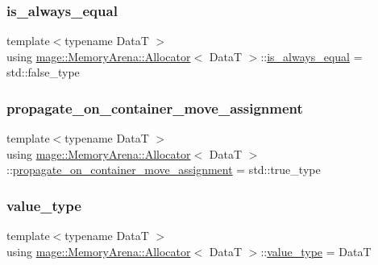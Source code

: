 \subsubsection{\texorpdfstring{is\+\_\+always\+\_\+equal}{is\_always\_equal}}
{\footnotesize\ttfamily template$<$typename DataT $>$ \\
using \hyperlink{classmage_1_1_memory_arena_1_1_allocator}{mage\+::\+Memory\+Arena\+::\+Allocator}$<$ DataT $>$\+::\hyperlink{classmage_1_1_memory_arena_1_1_allocator_aa03d66542fcf507199911bca8b270bfc}{is\+\_\+always\+\_\+equal} =  std\+::false\+\_\+type}

\hypertarget{classmage_1_1_memory_arena_1_1_allocator_adeee02145ab4a2eca5e38a70babd81e0}{}\label{classmage_1_1_memory_arena_1_1_allocator_adeee02145ab4a2eca5e38a70babd81e0} 
\subsubsection{\texorpdfstring{propagate\+\_\+on\+\_\+container\+\_\+move\+\_\+assignment}{propagate\_on\_container\_move\_assignment}}
{\footnotesize\ttfamily template$<$typename DataT $>$ \\
using \hyperlink{classmage_1_1_memory_arena_1_1_allocator}{mage\+::\+Memory\+Arena\+::\+Allocator}$<$ DataT $>$\+::\hyperlink{classmage_1_1_memory_arena_1_1_allocator_adeee02145ab4a2eca5e38a70babd81e0}{propagate\+\_\+on\+\_\+container\+\_\+move\+\_\+assignment} =  std\+::true\+\_\+type}

\hypertarget{classmage_1_1_memory_arena_1_1_allocator_a6ae3ef840bd738889b2c4136294a4f6d}{}\label{classmage_1_1_memory_arena_1_1_allocator_a6ae3ef840bd738889b2c4136294a4f6d} 
\subsubsection{\texorpdfstring{value\+\_\+type}{value\_type}}
{\footnotesize\ttfamily template$<$typename DataT $>$ \\
using \hyperlink{classmage_1_1_memory_arena_1_1_allocator}{mage\+::\+Memory\+Arena\+::\+Allocator}$<$ DataT $>$\+::\hyperlink{classmage_1_1_memory_arena_1_1_allocator_a6ae3ef840bd738889b2c4136294a4f6d}{value\+\_\+type} =  DataT}

